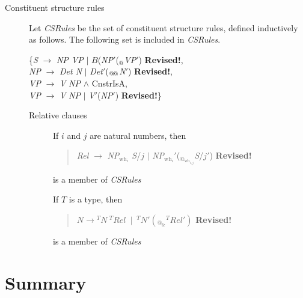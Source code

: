 \begin{description}
\begin{description}
  \end{description}
  


\item[Constituent structure rules] \mbox{}

Let \textit{CSRules} be the set of constituent structure rules,
defined inductively as follows.  The following set is included in \textit{CSRules}.
  
  \begin{tabbing}
    \{\=\textit{S} $\longrightarrow$ \textit{NP VP} $\mid$
    $B$(\textit{NP}$'$($_{\text{@}}$\textit{VP}$'$) \textbf{Revised!},\\
    \>\textit{NP} $\longrightarrow$ \textit{Det N} $\mid$
    \textit{Det}$'$($_{\text{@\!@}}$\textit{N}$'$) \textbf{Revised!},\\
    \>\textit{VP} $\longrightarrow$ \textit{V} \textit{NP}
    \d{\d{$\wedge$}} CnstrIsA, \\
    \>\textit{VP} $\longrightarrow$ \textit{V} \textit{NP} $\mid$
    \textit{V}$'$(\textit{NP}$'$) \textbf{Revised!}\}
  \end{tabbing}



  \begin{description}

    
  \item[Relative clauses] \mbox{}

    If $i$ and $j$ are natural numbers, then
    \begin{quote}
      \textit{Rel} $\longrightarrow$ \textit{NP}$_{\text{wh}_i}$
      \textit{S}/$j$ $\mid$
      \textit{NP}$_{\text{wh}_i}'$($_{\text{@}_{\text{wh}_{i,j}}}$\textit{S}/$j'$) \textbf{Revised!}
    \end{quote}
    is a member of \textit{CSRules}

    \bigskip

    If $T$ is a type, then
    \begin{quote}
      $\textit{N}\longrightarrow{^T\textit{N}}\ {^T\textit{Rel}}\
      \mid\
      {^T\textit{N}}'(_{\text{@}_\&}{^T\textit{Rel}}')$ \textbf{Revised!}
    \end{quote}
    is a member of \textit{CSRules}

\end{description}

\end{description}


\section{Summary}


